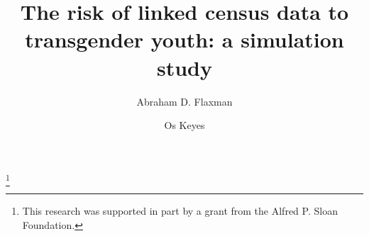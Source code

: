 \documentclass{jpc} %
\theoremstyle{plain}\newtheorem{satz}[thm]{Satz} %
\def\eg{{\em e.g.}}
\begin{document}
\title[Risk of linked census data to transgender youth]{The risk of linked census data to transgender youth: a simulation study}

\author[A.~Flaxman]{Abraham D. Flaxman}	%
\address{Institute for Health Metrics and Evaluation, University of Washington}	%
\thanks{This research was supported in part by a grant from the Alfred P. Sloan Foundation.}	%

\author[O. Keyes]{Os Keyes}





\end{document}
